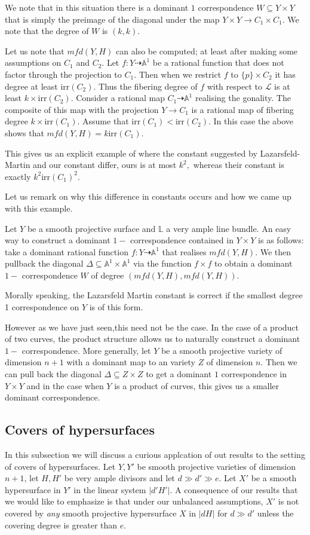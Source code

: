 \documentclass[12pt]{amsart}
\numberwithin{equation}{section}
\numberwithin{theorem}{section}
\theoremstyle{definition}
\theoremstyle{definition}
\def\AA{{\mathbb A}}
\def\LL{{\mathbb L}}
\def\Lc{{\mathcal{L}}}
\def\dra{{\dashrightarrow}}
\newcommand{\irr}{\textrm{irr}}
\begin{document}
We note that in this situation there is a dominant $1$ correspondence $W \subseteq Y \times Y$ that is simply the preimage of the diagonal under the map $Y\times Y\to C_1 \times C_1$. We note that the degree of $W$ is $(k,k)$.

Let us note that $mfd(Y, H)$ can also be computed; at least after making some assumptions on $C_1$ and $C_2$. Let $f: Y \dra \AA^1$ be a rational function that does not factor through the projection to $C_1$. Then when we restrict $f$ to $ \{p\} \times C_2$ it has degree at least $\irr(C_2).$ Thus the fibering degree of $f$ with respect to $\Lc$ is at least $k \times \irr(C_2).$ Consider a rational map $C_1 \dra \AA^1$ realising the gonality. The composite of this map with the projection $Y \to C_1$ is a rational map of fibering degree $k \times \irr(C_1)$. Assume that $\irr(C_1) <\irr(C_2).$ In this case the above shows that $mfd(Y, H) = k \irr(C_1).$

This gives us an explicit example of where  the constant suggested by Lazarsfeld- Martin and our constant differ, ours is at most $k^2,$ whereas their constant is exactly $k^2 \irr(C_1)^2$.


Let us remark on why this difference in constants occurs and how we came up with this example. 

Let $Y$ be a smooth projective surface and $\LL$ a very ample line bundle. An easy way to construct a dominant $1-$ correspondence contained in $Y \times Y$ is as follows: take a  dominant rational function $f: Y \dra \AA^1$ that realises $mfd(Y,H)$. We then pullback the diagonal $\Delta \subseteq \AA^1 \times \AA^1$ via the function $f \times f$ to obtain a dominant $1-$ correspondence $W$ of degree $(mfd(Y, H), mfd(Y, H))$.


Morally speaking, the Lazarsfeld Martin constant is correct if the smallest degree 1 correspondence on $Y$ is of this form. 

However as we have just seen,this need not be the case. In the case of a product of two curves, the product structure allows us to naturally construct a dominant $1-$ correspondence. More generally, let $Y$ be a smooth projective variety of dimension $n+1$ with a dominant map to an variety $Z$ of dimension $n$. Then we can pull back the diagonal $\Delta \subseteq Z \times Z$ to get a dominant $1$ correspondence in $Y \times Y$ and in the case when $Y$ is a product of curves, this gives us a smaller dominant correspondence.



\subsection{Covers of hypersurfaces}
In this subsection we will discuss a curious applcation of out results to the setting of covers of hypersurfaces.
Let $Y,Y'$ be smooth projective varieties of dimension $n+1$, let $H, H'$ be very ample divisors and let $d \gg d' \gg e.$ Let $X'$ be  a smooth hypersurface in $Y'$ in the linear system $ |d' H'|$.
A consequence of our results that we would like to emphasize is that under our unbalanced assumptions, $X'$ is not covered by \emph{any} smooth projective hypersurface $X$ in $|d H|$ for $d\gg d'$ unless the covering degree is greater than $e$.
\end{document}
